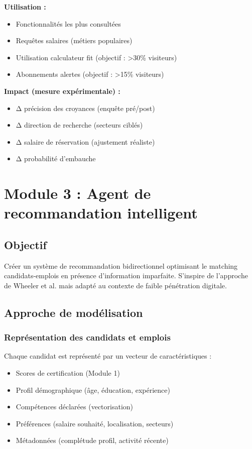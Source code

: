 \documentclass[12pt]{article}
\begin{document}
\textbf{Utilisation :}
\begin{itemize}
    \item Fonctionnalités les plus consultées
    \item Requêtes salaires (métiers populaires)
    \item Utilisation calculateur fit (objectif : >30\% visiteurs)
    \item Abonnements alertes (objectif : >15\% visiteurs)
\end{itemize}

\textbf{Impact (mesure expérimentale) :}
\begin{itemize}
    \item Δ précision des croyances (enquête pré/post)
    \item Δ direction de recherche (secteurs ciblés)
    \item Δ salaire de réservation (ajustement réaliste)
    \item Δ probabilité d'embauche
\end{itemize}

\section{Module 3 : Agent de recommandation intelligent}

\subsection{Objectif}

Créer un système de recommandation bidirectionnel optimisant le matching candidats-emplois en présence d'information imparfaite. S'inspire de l'approche de Wheeler et al. \citeyearpar{wheeler2022} mais adapté au contexte de faible pénétration digitale.

\subsection{Approche de modélisation}

\subsubsection{Représentation des candidats et emplois}

Chaque candidat est représenté par un vecteur de caractéristiques :
\begin{itemize}
    \item Scores de certification (Module 1)
    \item Profil démographique (âge, éducation, expérience)
    \item Compétences déclarées (vectorisation)
    \item Préférences (salaire souhaité, localisation, secteurs)
    \item Métadonnées (complétude profil, activité récente)
\end{itemize}
\end{document}
